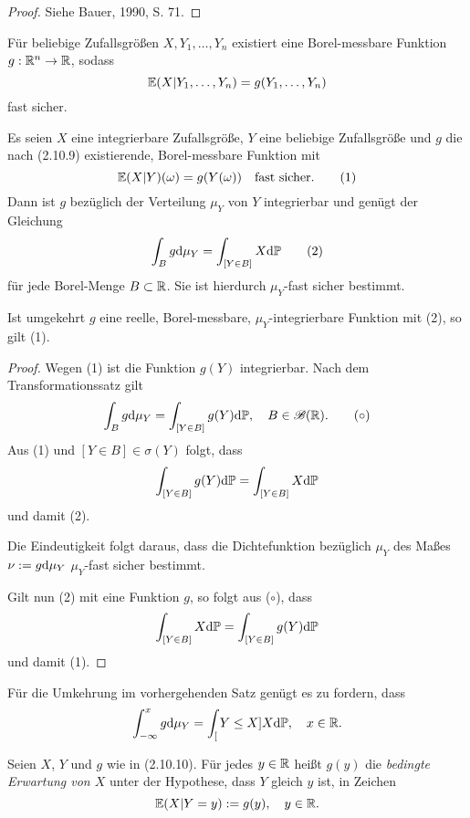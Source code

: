 \begin{proof}
  Siehe Bauer, 1990, S. 71.
\end{proof}

\begin{folg}
  Für beliebige Zufallsgrößen $X, Y_1, \ldots, Y_n$ existiert eine
  Borel-messbare Funktion $g : \mathbb{R}^n \to \mathbb{R}$, sodass
  \[ \mathbb{E}( X | Y_1, \ldots, Y_n) = g(Y_1, \ldots, Y_n) \]
  fast sicher.
\end{folg}

\clearpage

\begin{thm}
  Es seien $X$ eine integrierbare Zufallsgröße, $Y$ eine beliebige Zufallsgröße
  und $g$ die nach (2.10.9) existierende, Borel-messbare Funktion mit
  \[ \mathbb{E}( X | Y )(\omega) = g(Y(\omega)) \quad \text{fast sicher.} \tag{1} \]
  Dann ist $g$ bezüglich der Verteilung $\mu_Y$ von $Y$ integrierbar und genügt
  der Gleichung
  \[ \int_B g \mathrm{d} \mu_Y = \int_{[Y \in B]} X \mathrm{d} \mathbb{P} \tag{2} \]
  für jede Borel-Menge $B \subset \mathbb{R}$. Sie ist hierdurch $\mu_Y$-fast sicher
  bestimmt.

  Ist umgekehrt $g$ eine reelle, Borel-messbare, $\mu_Y$-integrierbare Funktion
  mit (2), so gilt (1).
\end{thm}

\begin{proof}
  Wegen (1) ist die Funktion $g(Y)$ integrierbar. Nach dem Transformationssatz
  gilt
  \[ \int_B g \mathrm{d} \mu_Y = \int_{[Y \in B]} g(Y) \mathrm{d} \mathbb{P}, \quad B \in
    \mathscr{B}(\mathbb{R}). \tag{$\circ$} \]
  Aus (1) und $[Y \in B] \in \sigma(Y)$ folgt, dass
  \[ \int_{[Y \in B]} g(Y) \mathrm{d} \mathbb{P} = \int_{[Y \in B]} X \mathrm{d} \mathbb{P} \]
  und damit (2).

  Die Eindeutigkeit folgt daraus, dass die Dichtefunktion bezüglich $\mu_Y$ des
  Maßes $\nu := g \mathrm{d} \mu_Y$ $\mu_Y$-fast sicher bestimmt.

  Gilt nun (2) mit eine Funktion $g$, so folgt aus ($\circ$), dass
  \[ \int_{[Y \in B]} X \mathrm{d} \mathbb{P} = \int_{[Y \in B]} g(Y) \mathrm{d} \mathbb{P} \]
  und damit (1).
\end{proof}

\begin{prgp}[Aufgabe]
  Für die Umkehrung im vorhergehenden Satz genügt es zu fordern, dass
  \[ \int_{-\infty}^x g \mathrm{d} \mu_Y = \int_[Y \le X] X \mathrm{d} \mathbb{P}, \quad x
    \in \mathbb{R}. \]
\end{prgp}

\begin{defn}
  Seien $X$, $Y$ und $g$ wie in (2.10.10). Für jedes $y \in \mathbb{R}$ heißt $g(y)$
  die \emph{bedingte Erwartung von $X$} unter der Hypothese, dass $Y$ gleich $y$
  ist, in Zeichen
  \[ \mathbb{E}(X | Y = y) := g(y), \quad y \in \mathbb{R}. \]
\end{defn}

